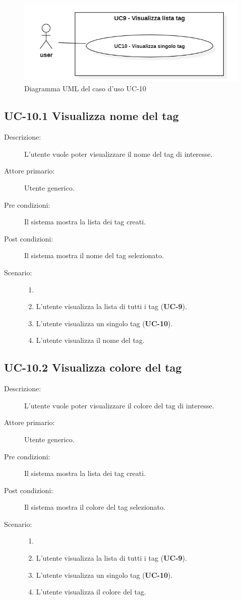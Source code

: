 \begin{figure}[H]
    \centering
    \includegraphics[width=0.8\linewidth]{UC10.png} %
    \caption{Diagramma UML del caso d'uso UC-10}
    \label{fig:UC8.10}
\end{figure}
\subsection{UC-10.1 Visualizza nome del tag}
\begin{description}
    \item[Descrizione:] L’utente vuole poter visualizzare il nome del tag di interesse.
    \item[Attore primario:] Utente generico.
    \item[Pre condizioni:] Il sistema mostra la lista dei tag creati.
    \item[Post condizioni:] Il sistema mostra il nome del tag selezionato.
    \item[Scenario:]
    \begin{enumerate}
        \item[]
        \item L’utente visualizza la lista di tutti i tag (\textbf{UC-9}).
        \item L'utente visualizza un singolo tag (\textbf{UC-10}).
        \item L'utente visualizza il nome del tag.
    \end{enumerate}
\end{description}

\subsection{UC-10.2 Visualizza colore del tag}
\begin{description}
    \item[Descrizione:] L’utente vuole poter visualizzare il colore del tag di interesse.
    \item[Attore primario:] Utente generico.
    \item[Pre condizioni:] Il sistema mostra la lista dei tag creati.
    \item[Post condizioni:] Il sistema mostra il colore del tag selezionato.
    \item[Scenario:] 
    \begin{enumerate}
        \item[]
        \item L’utente visualizza la lista di tutti i tag (\textbf{UC-9}).
        \item L'utente visualizza un singolo tag (\textbf{UC-10}).
        \item L'utente visualizza il colore del tag.
    \end{enumerate}
\end{description}

